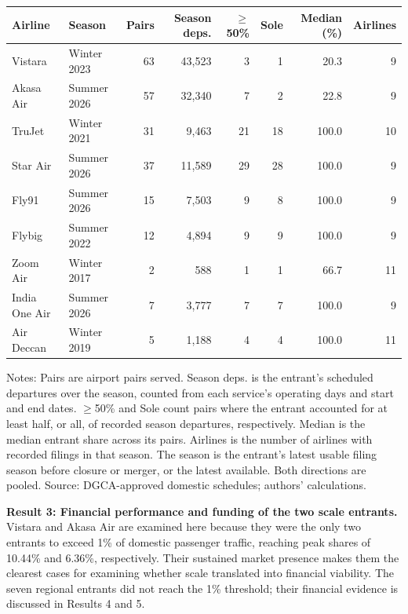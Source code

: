 \documentclass[12pt,a4paper]{article}
\newenvironment{o3box}{\ifthenelse{\boolean{o3highlight}}{\begingroup\color{o3sky}}{}}{\ifthenelse{\boolean{o3highlight}}{\endgroup}{}}
\begin{document}
\begin{o3box}
\begin{minipage}{\textwidth}
\footnotesize
{}
\label{tab:o3-routes}
\setlength{\tabcolsep}{3pt}\noindent\begin{tabularx}{\textwidth}{|>{\raggedright\arraybackslash}p{}|>{\raggedright\arraybackslash}X|r|r|r|r|r|r|}
\hline
\textbf{Airline} & \textbf{Season} & \textbf{Pairs} & \textbf{Season deps.} & \textbf{$\geq$50\%} & \textbf{Sole} & \textbf{Median (\%)} & \textbf{Airlines} \\
\hline
Vistara & Winter 2023 & 63 & 43,523 & 3 & 1 & 20.3 & 9 \\
\hline
Akasa Air & Summer 2026 & 57 & 32,340 & 7 & 2 & 22.8 & 9 \\
\hline
TruJet & Winter 2021 & 31 & 9,463 & 21 & 18 & 100.0 & 10 \\
\hline
Star Air & Summer 2026 & 37 & 11,589 & 29 & 28 & 100.0 & 9 \\
\hline
Fly91 & Summer 2026 & 15 & 7,503 & 9 & 8 & 100.0 & 9 \\
\hline
Flybig & Summer 2022 & 12 & 4,894 & 9 & 9 & 100.0 & 9 \\
\hline
Zoom Air & Winter 2017 & 2 & 588 & 1 & 1 & 66.7 & 11 \\
\hline
India One Air & Summer 2026 & 7 & 3,777 & 7 & 7 & 100.0 & 9 \\
\hline
Air Deccan & Winter 2019 & 5 & 1,188 & 4 & 4 & 100.0 & 11 \\
\hline
\end{tabularx}
\par\raggedright\footnotesize
Notes: Pairs are airport pairs served. Season deps. is the entrant's scheduled departures over the season, counted from each service's operating days and start and end dates. $\geq$50\% and Sole count pairs where the entrant accounted for at least half, or all, of recorded season departures, respectively. Median is the median entrant share across its pairs. Airlines is the number of airlines with recorded filings in that season. The season is the entrant's latest usable filing season before closure or merger, or the latest available. Both directions are pooled. Source: DGCA-approved domestic schedules; authors' calculations.
\end{minipage}\par\medskip

\textbf{Result 3: Financial performance and funding of the two scale entrants.} Vistara and Akasa Air are examined here because they were the only two entrants to exceed 1\% of domestic passenger traffic, reaching peak shares of 10.44\% and 6.36\%, respectively. Their sustained market presence makes them the clearest cases for examining whether scale translated into financial viability. The seven regional entrants did not reach the 1\% threshold; their financial evidence is discussed in Results 4 and 5.


\end{o3box}
\end{document}
